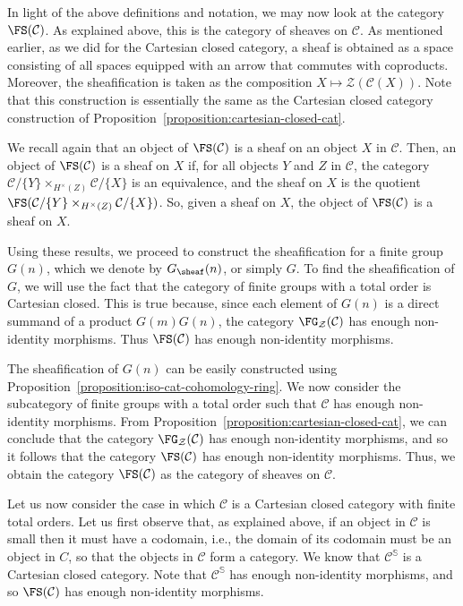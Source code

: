 \documentclass[a4paper,reqno,oneside]{article}
\begin{document}
In light of the above definitions and notation, we may now look at the category $\FS(\mathcal{C})$. As explained above, this is the category of sheaves on $\mathcal{C}$. As mentioned earlier, as we did for the Cartesian closed category, a sheaf is obtained as a space consisting of all spaces equipped with an arrow that commutes with coproducts. Moreover, the sheafification is taken as the composition $X \mapsto \mathcal{Z}(\mathcal{C}(X))$. Note that this construction is essentially the same as the Cartesian closed category construction of Proposition~\ref{proposition:cartesian-closed-cat}. 

We recall again that an object of $\FS(\mathcal{C})$ is a sheaf on an object $X$ in $\mathcal{C}$. Then, an object of $\FS(\mathcal{C})$ is a sheaf on $X$ if, for all objects $Y$ and $Z$ in $\mathcal{C}$, the category $\mathcal{C}/\{Y\} \times_{H^{\times}(Z)}\mathcal{C}/\{X\}$ is an equivalence, and the sheaf on $X$ is the quotient $\FS(\mathcal{C}/\{Y\} \times_{H^{\times}(Z)}\mathcal{C}/\{X\})$. So, given a sheaf on $X$, the object of $\FS(\mathcal{C})$ is a sheaf on $X$. 

Using these results, we proceed to construct the sheafification for a finite group $G(n)$, which we denote by $G_\sheaf(n)$, or simply $G$. To find the sheafification of $G$, we will use the fact that the category of finite groups with a total order is Cartesian closed. This is true because, since each element of $G(n)$ is a direct summand of a product $G(m)G(n)$, the category $\FG_{\mathcal{Z}}(\mathcal{C})$ has enough non-identity morphisms. Thus $\FS(\mathcal{C})$ has enough non-identity morphisms. 

The sheafification of $G(n)$ can be easily constructed using Proposition~\ref{proposition:iso-cat-cohomology-ring}. We now consider the subcategory of finite groups with a total order such that $\mathcal{C}$ has enough non-identity morphisms. From Proposition~\ref{proposition:cartesian-closed-cat}, we can conclude that the category $\FG_{\mathcal{Z}}(\mathcal{C})$ has enough non-identity morphisms, and so it follows that the category $\FS(\mathcal{C})$ has enough non-identity morphisms. Thus, we obtain the category $\FS(\mathcal{C})$ as the category of sheaves on $\mathcal{C}$.

Let us now consider the case in which $\mathcal{C}$ is a Cartesian closed category with finite total orders. Let us first observe that, as explained above, if an object in $\mathcal{C}$ is small then it must have a codomain, i.e., the domain of its codomain must be an object in $C$, so that the objects in $\mathcal{C}$ form a category. We know that $\mathcal{C}^{\mathbb{S}}$ is a Cartesian closed category. Note that $\mathcal{C}^{\mathbb{S}}$ has enough non-identity morphisms, and so $\FS(\mathcal{C})$ has enough non-identity morphisms. 
\end{document}
